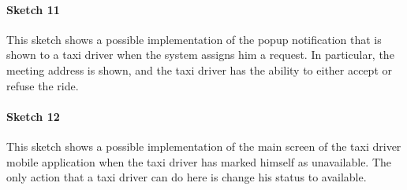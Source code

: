 \paragraph{Sketch 11}
{This sketch shows a possible implementation of the popup notification that is shown to a taxi driver when the system assigns him a request. In particular, the meeting address is shown, and the taxi driver has the ability to either accept or refuse the ride.}
\begin{figure}[H]
\centering
{}
\end{figure}


\paragraph{Sketch 12}
{This sketch shows a possible implementation of the main screen of the taxi driver mobile application when the taxi driver has marked himself as unavailable. The only action that a taxi driver can do here is change his status to available.}
\begin{figure}[H]
\centering
{}
\end{figure}



